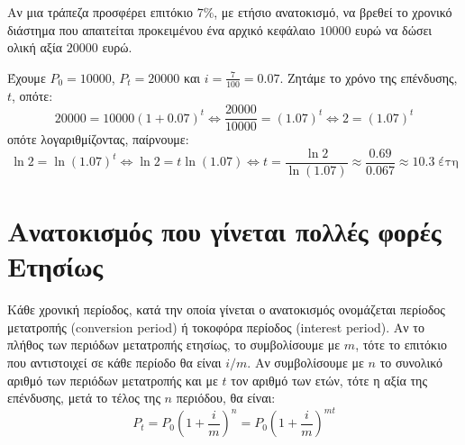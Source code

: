 \documentclass[a4paper,table]{report}
\begin{document}
\begin{example}
  Αν μια τράπεζα προσφέρει επιτόκιο $ 7\% $, με ετήσιο ανατοκισμό, να βρεθεί το χρονικό 
  διάστημα που απαιτείται προκειμένου ένα αρχικό κεφάλαιο $ 10000 $ ευρώ να δώσει ολική 
  αξία $ 20000 $ ευρώ.
\end{example}
\begin{solution}
  Έχουμε $ P_{0} = 10000$, $ P_{t}=20000 $ και $ i= \frac{7}{100} = 0.07 $. Ζητάμε 
  το χρόνο της επένδυσης, $t$, οπότε:
  \[
    20000 = 10000 (1+0.07)^{t} \Leftrightarrow \frac{20000}{10000} = (1.07)^{t}
    \Leftrightarrow 2 = (1.07)^{t} 
  \]
  οπότε λογαριθμίζοντας, παίρνουμε:
  \[ \ln{2} = \ln{(1.07)}^{t} \Leftrightarrow \ln{2} = t \ln{(1.07)} \Leftrightarrow t =
  \frac{\ln{2}}{\ln{(1.07)}} \approx \frac{0.69}{0.067} \approx 10.3 \; \text{έτη} \]
\end{solution}


\section*{Ανατοκισμός που γίνεται πολλές φορές Ετησίως}

Κάθε χρονική περίοδος, κατά την οποία γίνεται ο ανατοκισμός ονομάζεται
\textcolor{Col1}{περίοδος μετατροπής} (conversion period) ή τοκοφόρα περίοδος 
(interest period). Αν το πλήθος των περιόδων μετατροπής ετησίως, το συμβολίσουμε με 
$ m $, τότε το επιτόκιο που αντιστοιχεί σε κάθε περίοδο θα είναι $ {i}/{m} $. Αν 
συμβολίσουμε με $n$ το συνολικό αριθμό των περιόδων μετατροπής και με $t$ τον αριθμό 
των ετών, τότε η αξία της επένδυσης, μετά το τέλος της $n$ περιόδου, θα είναι:
\[
  P_{t} = P_{0} \left(1+ \frac{i}{m} \right)^{n} = 
  P_{0}\left(1+ \frac{i}{m} \right)^{mt} 
\] 
\end{document}
